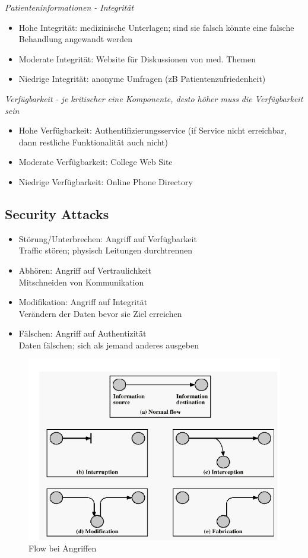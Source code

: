 \textit{Patienteninformationen - Integrität}
\begin{itemize}
	\item Hohe Integrität: medizinische Unterlagen; sind sie falsch könnte eine falsche Behandlung angewandt werden
	\item Moderate Integrität: Website für Diskussionen von med. Themen
	\item Niedrige Integrität: anonyme Umfragen (zB Patientenzufriedenheit)
\end{itemize}

\textit{Verfügbarkeit - je kritischer eine Komponente, desto höher muss die Verfügbarkeit sein}
\begin{itemize}
	\item Hohe Verfügbarkeit: Authentifizierungsservice (if Service nicht erreichbar, dann restliche Funktionalität auch nicht)
	\item Moderate Verfügbarkeit: College Web Site
	\item Niedrige Verfügbarkeit: Online Phone Directory
\end{itemize}

\subsection{Security Attacks}
\begin{itemize}
	\item Störung/Unterbrechen: Angriff auf Verfügbarkeit\\
	Traffic stören; physisch Leitungen durchtrennen
	\item Abhören: Angriff auf Vertraulichkeit\\
	Mitschneiden von Kommunikation
	\item Modifikation: Angriff auf Integrität\\
	Verändern der Daten bevor sie Ziel erreichen
	\item Fälschen: Angriff auf Authentizität\\
	Daten fälschen; sich als jemand anderes ausgeben
\end{itemize}

\begin{figure}[!h]
	\centering
	\includegraphics[scale=0.6]{img/security_attacks.png}
	\caption{Flow bei Angriffen}
\end{figure}

